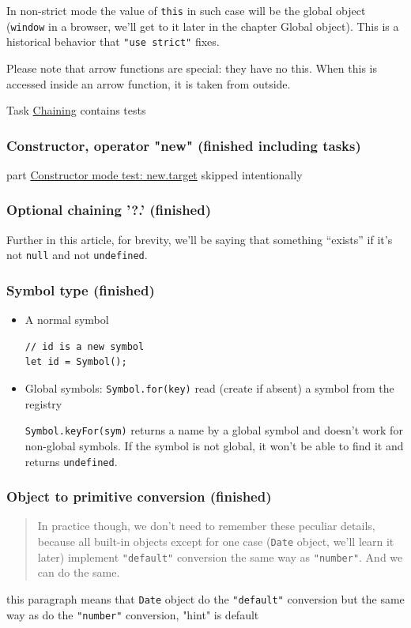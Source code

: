 \documentclass[a4paper, 12pt]{article}
\begin{document}
\noindent In non-strict mode the value of \verb|this| in such case will be the global object (\verb|window| in a browser, we'll get to it later in the chapter Global object). This is a historical behavior that \verb|"use strict"| fixes.

Please note that arrow functions are special: they have no this. When this is accessed inside an arrow function, it is taken from outside.

Task \href{https://javascript.info/object-methods#chaining}{Chaining} contains tests

\subsubsection{Constructor, operator "new" (finished including tasks)}
part \href{https://javascript.info/constructor-new#constructor-mode-test-new-target}{Constructor mode test: new.target} skipped intentionally

\subsubsection{Optional chaining '?.' (finished)}
Further in this article, for brevity, we'll be saying that something “exists” if it's not \verb|null| and not \verb|undefined|.

\subsubsection{Symbol type (finished)}
\begin{itemize}
\item 
A normal symbol
\begin{verbatim}
// id is a new symbol
let id = Symbol();
\end{verbatim}

\item 
Global symbols: \verb|Symbol.for(key)| read (create if absent) a symbol from the registry

\verb|Symbol.keyFor(sym)| returns a name by a global symbol and doesn't work for non-global symbols. If the symbol is not global, it won't be able to find it and returns \verb|undefined|.

\end{itemize}

\subsubsection{Object to primitive conversion (finished)}
\begin{quotation}
In practice though, we don't need to remember these peculiar details, because all built-in objects except for one case (\verb|Date| object, we'll learn it later) implement \verb|"default"| conversion the same way as \verb|"number"|. And we can do the same.
\end{quotation}
this paragraph means that \verb|Date| object do the \verb|"default"| conversion but the same way as do the \verb|"number"| conversion, "hint" is default
\end{document}
